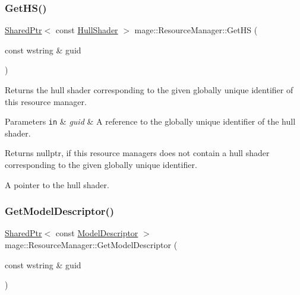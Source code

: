 \subsubsection{\texorpdfstring{Get\+H\+S()}{GetHS()}}
{\footnotesize\ttfamily \hyperlink{namespacemage_a1e01ae66713838a7a67d30e44c67703e}{Shared\+Ptr}$<$ const \hyperlink{namespacemage_a964e5e384b0e55ac900c819da48b6000}{Hull\+Shader} $>$ mage\+::\+Resource\+Manager\+::\+Get\+HS (\begin{DoxyParamCaption}\item[{const wstring \&}]{guid }\end{DoxyParamCaption})\hspace{0.3cm}{\ttfamily [noexcept]}}

Returns the hull shader corresponding to the given globally unique identifier of this resource manager.


\begin{DoxyParams}[1]{Parameters}
\mbox{\tt in}  & {\em guid} & A reference to the globally unique identifier of the hull shader. \\
\hline
\end{DoxyParams}
\begin{DoxyReturn}{Returns}
{\ttfamily nullptr}, if this resource managers does not contain a hull shader corresponding to the given globally unique identifier. 

A pointer to the hull shader. 
\end{DoxyReturn}
\hypertarget{classmage_1_1_resource_manager_a311d328f5a7cbb82da84815ee195c06f}{}\label{classmage_1_1_resource_manager_a311d328f5a7cbb82da84815ee195c06f} 
\subsubsection{\texorpdfstring{Get\+Model\+Descriptor()}{GetModelDescriptor()}}
{\footnotesize\ttfamily \hyperlink{namespacemage_a1e01ae66713838a7a67d30e44c67703e}{Shared\+Ptr}$<$ const \hyperlink{classmage_1_1_model_descriptor}{Model\+Descriptor} $>$ mage\+::\+Resource\+Manager\+::\+Get\+Model\+Descriptor (\begin{DoxyParamCaption}\item[{const wstring \&}]{guid }\end{DoxyParamCaption})\hspace{0.3cm}{\ttfamily [noexcept]}}


